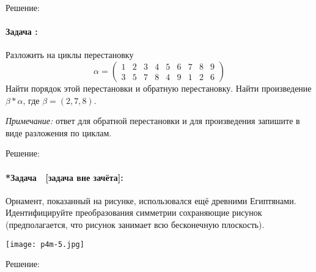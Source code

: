 \documentclass[amsmath,amssymb,12pt]{revtex4}
\newcommand{\1}{\frac{1}{2}}
\begin{document}
\begin{center}
{\large Решение: }
\end{center}

\mbox{}
\vspace{8cm}


\newpage
\addtocounter{prn}{1}
\vspace{0.3cm}
\paragraph*{\large Задача \theprn: }
Разложить на циклы перестановку
$$
	\alpha = \left(
	\begin{array}{ccccccccc}
		1 &  2 & 3 & 4 & 5 & 6 & 7 & 8 & 9 \\
		3 & 5 & 7 & 8 & 4 & 9 & 1 & 2 & 6 
	\end{array}
	\right)
$$
Найти порядок этой  перестановки и обратную перестановку. Найти произведение $\beta *\alpha $, где $\beta = (2,7,8)$.

\medskip 
\textit{Примечание:} ответ для обратной перестановки и для произведения запишите в виде разложения по циклам.



\begin{center}
{\large Решение: }
\end{center}


\vspace{6cm}


\addtocounter{prn}{1}
\vspace{0.3cm}
\paragraph*{*\large Задача \theprn $\;$ [задача вне зачёта]: }

Орнамент, показанный на рисунке, использовался ещё древними Египтянами. Идентифицируйте преобразования симметрии сохраняющие рисунок (предполагается, что рисунок занимает всю бесконечную плоскость).

\centerline{\texttt{[image: p4m-5.jpg]}}

\begin{center}
{\large Решение: }
\end{center}


\vspace{6cm}



\end{document}
